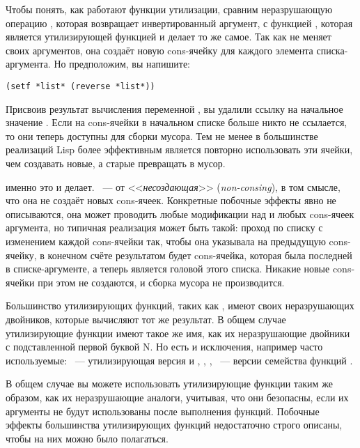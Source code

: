 Чтобы понять, как работают функции утилизации, сравним неразрушающую операцию
, которая возвращает инвертированный аргумент, с функцией ,
которая является утилизирующей функцией и делает то же самое. Так как  не
меняет своих аргументов, она создаёт новую cons-ячейку для каждого элемента
списка-аргумента. Но предположим, вы напишите:

\begin{lstlisting}
(setf *list* (reverse *list*))
\end{lstlisting}

Присвоив результат вычисления переменной , вы удалили ссылку на начальное
значение . Если на cons-ячейки в начальном списке больше никто не ссылается,
то они теперь доступны для сборки мусора. Тем не менее в большинстве реализаций Lisp более
эффективным является повторно использовать эти ячейки, чем создавать новые, а старые
превращать в мусор.

 именно это и делает. ~--- от <<\textit{несоздающая}>> (\textit{non-consing}),
в том смысле, что она не создаёт новых cons-ячеек. Конкретные побочные эффекты 
явно не описываются, она может проводить любые модификации над  и 
любых cons-ячеек аргумента, но типичная реализация может быть такой: проход по списку с
изменением  каждой cons-ячейки так, чтобы она указывала на предыдущую
cons-ячейку, в конечном счёте результатом будет cons-ячейка, которая была последней в
списке-аргументе, а теперь является головой этого списка. Никакие новые cons-ячейки при
этом не создаются, и сборка мусора не производится.

Большинство утилизирующих функций, таких как , имеют своих неразрушающих
двойников, которые вычисляют тот же результат. В общем случае утилизирующие функции имеют
такое же имя, как их неразрушающие двойники с подставленной первой буквой N. Но есть и
исключения, например часто используемые: ~--- утилизирующая версия
 и , , ,
~--- версии семейства функций .

В общем случае вы можете использовать утилизирующие функции таким же образом, как их
неразрушающие аналоги, учитывая, что они безопасны, если их аргументы не будут
использованы после выполнения функций. Побочные эффекты большинства утилизирующих функций
недостаточно строго описаны, чтобы на них можно было полагаться.

